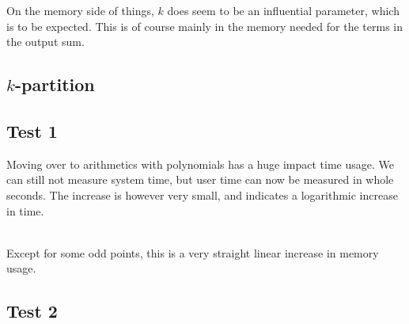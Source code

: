 \documentclass[a4paper, titlepage]{article}
\begin{document}
On the memory side of things, $k$ does seem to be an influential parameter, which is to be expected. This is of course mainly in the memory needed for the terms in the output sum.

\subsection{$k$-partition}

\subsection*{Test 1}


Moving over to arithmetics with polynomials has a huge impact time usage. We can still not measure system time, but user time can now be measured in whole seconds. The increase is however very small, and indicates a logarithmic increase in time.
\\\\

Except for some odd points, this is a very straight linear increase in memory usage.

\subsection*{Test 2}

\end{document}
